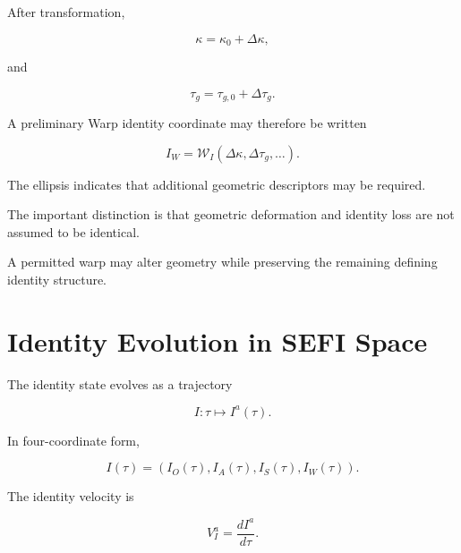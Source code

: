\documentclass[12pt,oneside]{book}
\begin{document}
After transformation,

\begin{equation}
    \kappa
    =
    \kappa_0
    +
    \Delta\kappa,
\end{equation}

and

\begin{equation}
    \tau_g
    =
    \tau_{g,0}
    +
    \Delta\tau_g.
\end{equation}

A preliminary Warp identity coordinate may therefore be written

\begin{equation}
    I_W
    =
    \mathcal{W}_I
    \left(
        \Delta\kappa,
        \Delta\tau_g,
        \ldots
    \right).
    \label{eq:warp-identity-coordinate}
\end{equation}

The ellipsis indicates that additional geometric descriptors may
be required.

The important distinction is that geometric deformation and
identity loss are not assumed to be identical.

A permitted warp may alter geometry while preserving the
remaining defining identity structure.


\section{Identity Evolution in SEFI Space}
\label{sec:identity-evolution-sefi}

The identity state evolves as a trajectory

\begin{equation}
    I:
    \tau
    \longmapsto
    I^a(\tau).
    \label{eq:sefi-identity-trajectory}
\end{equation}

In four-coordinate form,

\begin{equation}
    I(\tau)
    =
    \left(
        I_O(\tau),
        I_A(\tau),
        I_S(\tau),
        I_W(\tau)
    \right).
    \label{eq:sefi-four-dimensional-trajectory}
\end{equation}

The identity velocity is

\begin{equation}
    V_I^a
    =
    \frac{dI^a}{d\tau}.
    \label{eq:sefi-identity-velocity}
\end{equation}
\end{document}
